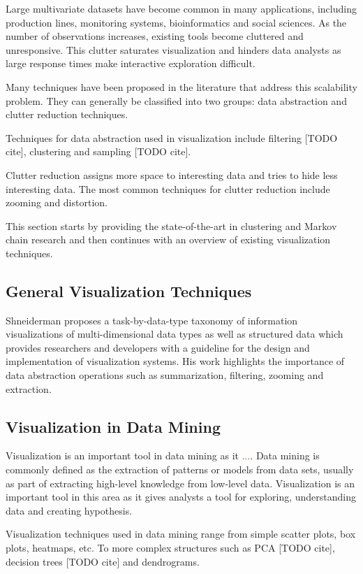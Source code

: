 Large multivariate datasets have become common in many applications, including production lines,
monitoring systems, bioinformatics and social sciences. As the number of observations increases,
existing tools become cluttered and unresponsive. This clutter saturates visualization and hinders
data analysts as large response times make interactive exploration difficult.

Many techniques have been proposed in the literature that address this scalability problem.
They can generally be classified into two groups: data abstraction and clutter reduction 
techniques.

Techniques for data abstraction used in visualization include filtering [TODO cite], clustering
and sampling [TODO cite].

Clutter reduction assigns more space to interesting data and tries to hide less interesting data.
The most common techniques for clutter reduction include zooming and distortion.

This section starts by providing the state-of-the-art in clustering and Markov chain research and
then continues with an overview of existing visualization techniques.

\subsection{General Visualization Techniques}

Shneiderman \cite{545307} proposes a task-by-data-type taxonomy of information visualizations of multi-dimensional
data types as well as structured data which provides researchers and developers with a guideline for
the design and implementation of visualization systems. His work highlights the importance of data
abstraction operations such as summarization, filtering, zooming and extraction.

\subsection{Visualization in Data Mining}

Visualization is an important tool in data mining as it \textcolor{red}{...}. Data mining is commonly defined
as the extraction of patterns or models from data sets, usually as part of extracting high-level
knowledge from low-level data. Visualization is an important tool in this area as it gives analysts a
tool for exploring, understanding data and creating hypothesis.

Visualization techniques used in data mining range from simple scatter plots, box plots, heatmaps, etc.
To more complex structures such as PCA [TODO cite], decision trees [TODO cite] and dendrograms.

